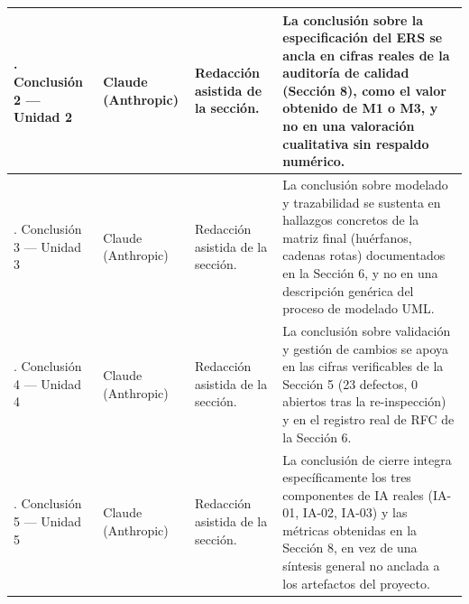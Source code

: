 \documentclass[journal,onecolumn]{IEEEtran}
\begin{document}
\begin{longtable}{
			|>{\raggedright\arraybackslash}p{3.2cm}
			|>{\raggedright\arraybackslash}p{1.8cm}
			|>{\raggedright\arraybackslash}p{4.3cm}
			|>{\raggedright\arraybackslash}p{5cm}|}
		\hline
		10. Conclusión 2 --- Unidad 2 &
		Claude (Anthropic) &
		Redacción asistida de la sección. &
		La conclusión sobre la especificación del ERS se ancla en cifras
		reales de la auditoría de calidad (Sección 8), como el valor
		obtenido de M1 o M3, y no en una valoración cualitativa sin
		respaldo numérico. \\
		\hline
		10. Conclusión 3 --- Unidad 3 &
		Claude (Anthropic) &
		Redacción asistida de la sección. &
		La conclusión sobre modelado y trazabilidad se sustenta en
		hallazgos concretos de la matriz final (huérfanos, cadenas rotas)
		documentados en la Sección 6, y no en una descripción genérica del
		proceso de modelado UML. \\
		\hline
		10. Conclusión 4 --- Unidad 4 &
		Claude (Anthropic) &
		Redacción asistida de la sección. &
		La conclusión sobre validación y gestión de cambios se apoya en
		las cifras verificables de la Sección 5 (23 defectos, 0 abiertos
		tras la re-inspección) y en el registro real de RFC de la Sección
		6. \\
		\hline
		10. Conclusión 5 --- Unidad 5 &
		Claude (Anthropic) &
		Redacción asistida de la sección. &
		La conclusión de cierre integra específicamente los tres
		componentes de IA reales (IA-01, IA-02, IA-03) y las métricas
		obtenidas en la Sección 8, en vez de una síntesis general no
		anclada a los artefactos del proyecto. \\
		\hline
	\end{longtable}
	\normalsize
	
\end{document}
